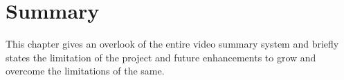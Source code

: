 \section{Summary}
This chapter gives an overlook of the entire video summary system and briefly
states the limitation of the project and future enhancements to grow and
overcome the limitations of the same.



